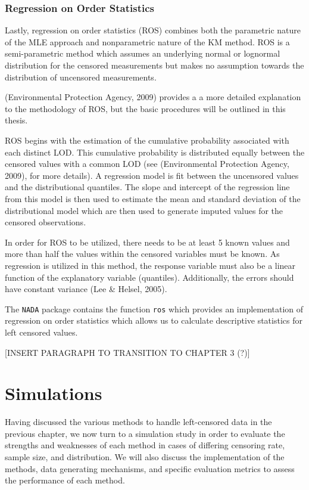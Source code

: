 \documentclass[12pt, twoside]{amherstthesis}
\begin{document}
\hypertarget{ROS}{%
\subsection{Regression on Order Statistics}\label{ROS}}

Lastly, regression on order statistics (ROS) combines both the parametric nature of the MLE approach and nonparametric nature of the KM method. ROS is a semi-parametric method which assumes an underlying normal or lognormal distribution for the censored measurements but makes no assumption towards the distribution of uncensored measurements.

(Environmental Protection Agency, 2009) provides a a more detailed explanation to the methodology of ROS, but the basic procedures will be outlined in this thesis.

ROS begins with the estimation of the cumulative probability associated with each distinct LOD. This cumulative probability is distributed equally between the censored values with a common LOD (see (Environmental Protection Agency, 2009), for more details). A regression model is fit between the uncensored values and the distributional quantiles. The slope and intercept of the regression line from this model is then used to estimate the mean and standard deviation of the distributional model which are then used to generate imputed values for the censored observations.

In order for ROS to be utilized, there needs to be at least 5 known values and more than half the values within the censored variables must be known. As regression is utilized in this method, the response variable must also be a linear function of the explanatory variable (quantiles). Additionally, the errors should have constant variance (Lee \& Helsel, 2005).

The \texttt{NADA} package contains the function \texttt{ros} which provides an implementation of regression on order statistics which allows us to calculate descriptive statistics for left censored values.

{[}INSERT PARAGRAPH TO TRANSITION TO CHAPTER 3 (?){]}

\hypertarget{simulations}{%
\chapter{Simulations}\label{simulations}}

Having discussed the various methods to handle left-censored data in the previous chapter, we now turn to a simulation study in order to evaluate the strengths and weaknesses of each method in cases of differing censoring rate, sample size, and distribution. We will also discuss the implementation of the methods, data generating mechanisms, and specific evaluation metrics to assess the performance of each method.
\end{document}
